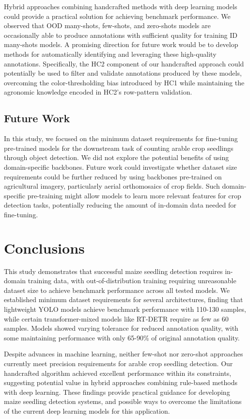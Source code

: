 \documentclass[journal,article,submit,pdftex,moreauthors]{Definitions/mdpi}
\begin{document}
Hybrid approaches combining handcrafted methods with deep learning models could provide a practical solution 
for achieving benchmark performance. We observed that OOD many-shots, few-shots, and zero-shots models are 
occasionally able to produce annotations with sufficient quality for training ID many-shots models. A promising 
direction for future work would be to develop methods for automatically identifying and leveraging these 
high-quality annotations. Specifically, the HC2 component of our handcrafted approach could potentially be used 
to filter and validate annotations produced by these models, overcoming the color-thresholding bias introduced 
by HC1 while maintaining the agronomic knowledge encoded in HC2's row-pattern validation.

\subsection{Future Work}
In this study, we focused on the minimum dataset requirements for fine-tuning pre-trained models for the 
downstream task of counting arable crop seedlings through object detection. We did not explore the potential 
benefits of using domain-specific backbones. Future work could investigate whether dataset size requirements 
could be further reduced by using backbones pre-trained on agricultural imagery, particularly aerial 
orthomosaics of crop fields. Such domain-specific pre-training might allow models to learn more relevant 
features for crop detection tasks, potentially reducing the amount of in-domain data needed for fine-tuning.

\section{Conclusions}

This study demonstrates that successful maize seedling detection requires in-domain 
training data, with out-of-distribution training requiring unreasonable dataset size to 
achieve benchmark performance across all tested models. 
We established minimum dataset requirements for several 
architectures, finding that lightweight YOLO models achieve benchmark performance 
with 110-130 samples, while certain transformer-mixed models like RT-DETR require as 
few as 60 samples. Models showed varying tolerance for reduced annotation quality, 
with some maintaining performance with only 65-90\% of original annotation quality.

Despite advances in machine learning, neither few-shot nor zero-shot approaches currently 
meet precision requirements for arable crop seedling detection. Our handcrafted 
algorithm achieved excellent performance within its constraints, suggesting potential 
value in hybrid approaches combining rule-based methods with deep learning. These 
findings provide practical guidance for developing maize seedling detection 
systems, and possible ways to overcome the limitations of the current deep learning
models for this application.
 
\end{document}
